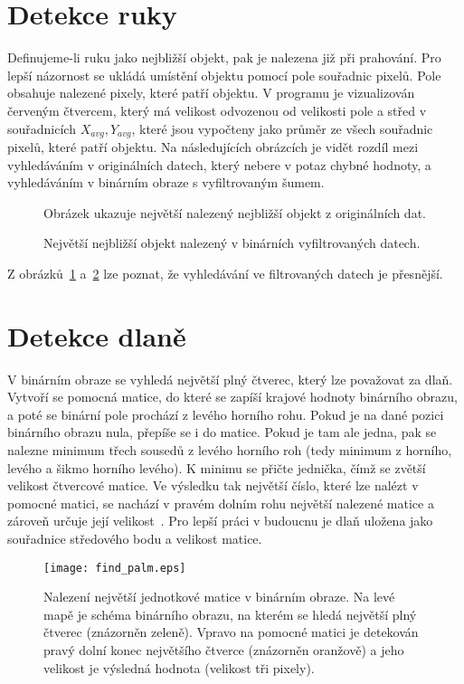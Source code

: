 \section{Detekce ruky}
Definujeme-li ruku jako nejbližší objekt, pak je nalezena již při prahování. Pro lepší názornost se ukládá umístění objektu pomocí pole souřadnic pixelů. Pole obsahuje nalezené pixely, které patří objektu. V programu je vizualizován červeným čtvercem, který má velikost odvozenou od velikosti pole a střed v souřadnicích $ X_{avg}, Y_{avg} $, které jsou vypočteny jako průměr ze všech souřadnic pixelů, které patří objektu. 
Na následujících obrázcích je vidět rozdíl mezi vyhledáváním v originálních datech, který nebere v potaz chybné hodnoty, a vyhledáváním v binárním obraze s vyfiltrovaným šumem.
\begin{figure}[htp]
\centering
{}
\caption{Obrázek ukazuje největší nalezený nejbližší objekt z originálních dat.}
\label{pic15}
\end{figure}
\begin{figure}[htp]
\centering
{}
\caption{Největší nejbližší objekt nalezený v binárních vyfiltrovaných datech.}
\label{pic16}
\end{figure}

Z obrázků~\ref{pic15} a~\ref{pic16} lze poznat, že vyhledávání ve filtrovaných datech je přesnější.
\newpage
\section{Detekce dlaně}
V binárním obraze se vyhledá největší plný čtverec, který lze považovat za dlaň. Vytvoří se pomocná matice, do které se zapíší krajové hodnoty binárního obrazu, a poté se binární pole prochází z levého horního rohu. Pokud je na dané pozici binárního obrazu nula, přepíše se i do matice. Pokud je tam ale jedna, pak se nalezne minimum třech sousedů z levého horního roh (tedy minimum z horního, levého a šikmo horního levého). K minimu se přičte jednička, čímž se zvětší velikost čtvercové matice. Ve výsledku tak největší číslo, které lze nalézt v pomocné matici, se nachází v pravém dolním rohu největší nalezené matice a zároveň určuje její velikost~\cite{23}. Pro lepší práci v budoucnu je dlaň uložena jako souřadnice středového bodu a velikost matice.

\begin{figure} [htp]
\centering
\texttt{[image: find\_palm.eps]}
\centering
\caption{Nalezení největší jednotkové matice v binárním obraze. Na levé mapě je schéma binárního obrazu, na kterém se hledá největší plný čtverec (znázorněn zeleně). Vpravo na pomocné matici je detekován pravý dolní konec největšího čtverce (znázorněn oranžově) a jeho velikost je výsledná hodnota (velikost tři pixely). }
\label{pic17}
\end{figure}

